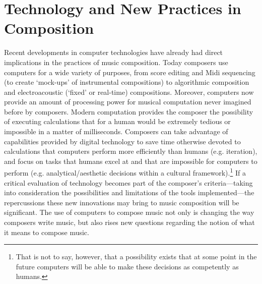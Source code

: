 \section{Technology and New Practices in Composition}

Recent developments in computer technologies have already had direct implications in the practices of music composition. Today composers use computers for a wide variety of purposes, from score editing and Midi sequencing (to create `mock-ups' of instrumental compositions) to algorithmic composition and electroacoustic (`fixed' or real-time) compositions. Moreover, computers now provide an amount of processing power for musical computation never imagined before by composers. Modern computation provides the composer the possibility of executing calculations that for a human would be extremely tedious or impossible in a matter of milliseconds. Composers can take advantage of capabilities provided by digital technology to save time otherwise devoted to calculations that computers perform more efficiently than humans (e.g. iteration), and focus on tasks that humans excel at and that are impossible for computers to perform (e.g. analytical/aesthetic decisions  within a cultural framework).\footnote{That is not to say, however, that a possibility exists that at some point in the future computers will be able to make these decisions as competently as humans.} If a critical evaluation of technology becomes part of the composer's criteria---taking into consideration the possibilities and limitations of the tools implemented---the repercussions these new innovations may bring to music composition will be significant. The use of computers to compose music not only is changing the way composers write music, but also rises new questions regarding the notion of what it means to compose music.

